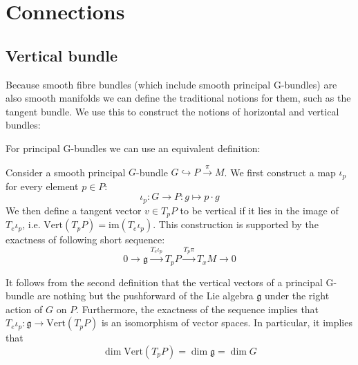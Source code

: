 \section{Connections}
\subsection{Vertical bundle}
	
	Because smooth fibre bundles (which include smooth principal G-bundles) are also smooth manifolds we can define the traditional notions for them, such as the tangent bundle. We use this to construct the notions of horizontal and vertical bundles:

	For principal G-bundles we can use an equivalent definition:
	\begin{adefinition}
		Consider a smooth principal $G$-bundle $G\hookrightarrow P\xrightarrow{\pi} M$. We first construct a map $\iota_p$ for every element $p\in P$:
		\begin{equation}
			\iota_p:G\rightarrow P: g\mapsto p\cdot g
		\end{equation}
		We then define a tangent vector $v\in T_p P$ to be vertical if it lies in the image of $T_e\iota_p$, i.e. $\text{Vert}(T_pP) = \text{im}(T_e\iota_p)$. This construction is supported by the exactness of following short sequence:
		\begin{equation}
			0\xrightarrow{} \mathfrak{g} \xrightarrow{T_e\iota_p} T_p P\xrightarrow{T_p\pi} T_xM \xrightarrow{} 0
		\end{equation}
	\end{adefinition}
	\begin{property}[Dimension]
		It follows from the second definition that the vertical vectors of a principal G-bundle are nothing but the pushforward of the Lie algebra $\mathfrak{g}$ under the right action of $G$ on $P$. Furthermore, the exactness of the sequence implies that $T_e\iota_p:\mathfrak{g}\rightarrow\text{Vert}(T_pP)$ is an isomorphism of vector spaces. In particular, it implies that
		\begin{equation}
			\label{manifolds:vertical_dimension}
			\dim\text{Vert}(T_pP) = \dim\mathfrak{g} = \dim G
		\end{equation}
	\end{property}
	
